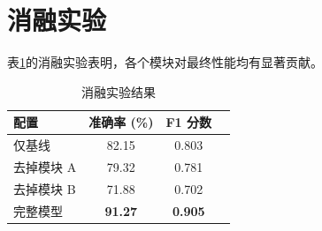 \section{消融实验}
\label{sec:ablation}

表\ref{tab:ablation}的消融实验表明，各个模块对最终性能均有显著贡献。

\begin{table}[htbp]
\centering
\caption{消融实验结果}
\label{tab:ablation}
\begin{tabular}{lccc}
\toprule
配置 & 准确率 (\%) & F1 分数 \\
\midrule
仅基线 & 82.15 & 0.803 \\
去掉模块 A & 79.32 & 0.781 \\
去掉模块 B & 71.88 & 0.702 \\
完整模型 & \textbf{91.27} & \textbf{0.905} \\
\bottomrule
\end{tabular}
\end{table}
